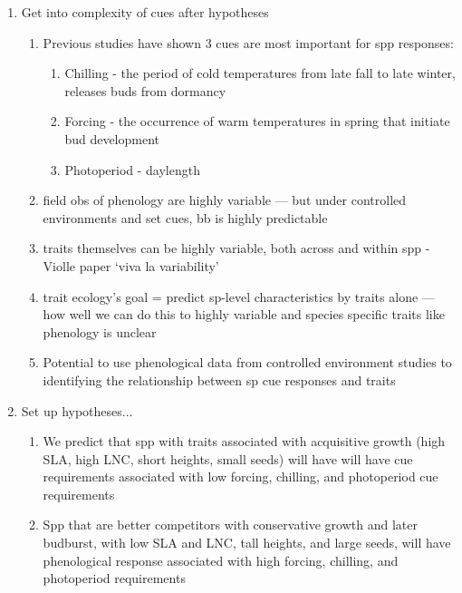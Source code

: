 \documentclass{article}
\begin{document}
\begin{enumerate}
\item Get into complexity of cues after hypotheses %
\begin{enumerate}
\item Previous studies have shown 3 cues are most important for spp responses:
\begin{enumerate}
\item Chilling - the period of cold temperatures from late fall to late winter, releases buds from dormancy
\item Forcing - the occurrence of warm temperatures in spring that initiate bud development 
\item Photoperiod - daylength
\end{enumerate}
\item field obs of phenology are highly variable — but under controlled environments and set cues, bb is highly predictable
\item traits themselves can be highly variable, both across and within spp - Violle paper ‘viva la variability’
\item trait ecology’s goal = predict sp-level characteristics by traits alone — how well we can do this to highly variable and species specific traits like phenology is unclear
\item Potential to use phenological data from controlled environment studies to identifying the relationship between sp cue responses and traits
\end{enumerate}

\item Set up hypotheses...
\begin{enumerate}
\item We predict that spp with traits associated with acquisitive growth (high SLA, high LNC, short heights, small seeds) will have will have cue requirements associated with low forcing, chilling, and photoperiod cue requirements
\item Spp that are better competitors with conservative growth and later budburst, with low SLA and LNC, tall heights, and large seeds, will have phenological response associated with high forcing, chilling, and photoperiod requirements
\end{enumerate}


\end{enumerate}
\end{document}
